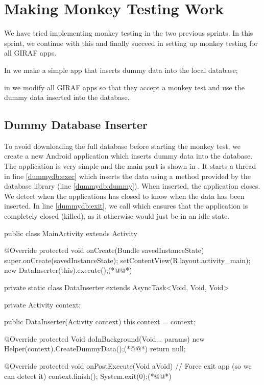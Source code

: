 \chapter{Making Monkey Testing Work}
We have tried implementing monkey testing in the two previous sprints. In this sprint, we continue with this and finally succeed in setting up monkey testing for all GIRAF apps.

\begin{chapterorganization}
  \item In  we make a simple app that inserts dummy data into the local database;
  \item in  we modify all GIRAF apps so that they accept a monkey test and use the dummy data inserted into the database.
\end{chapterorganization}

\section{Dummy Database Inserter}\label{sec:dummy_db_inserter}
To avoid downloading the full database before starting the monkey test, we create a new Android application which inserts dummy data into the database. The application is very simple and the main part is shown in . It starts a thread in line \ref{dummydb:exec} which inserts the data using a method provided by the database library (line \ref{dummydb:dummy}). When inserted, the application closes. We detect when the applications has closed to know when the data has been inserted. In line \ref{dummydb:exit}, we call  which ensures that the application is completely closed (killed), as it otherwise would just be in an idle state.

\begin{javacode}[float=tbp,caption=Dummy database inserter \mono{MainActivity} (written in Java),label=lst:dummy_db_ins_main_activity]
public class MainActivity extends Activity {
    @Override
    protected void onCreate(Bundle savedInstanceState) {
        super.onCreate(savedInstanceState);
        setContentView(R.layout.activity_main);
        new DataInserter(this).execute();(*@\label{dummydb:exec}@*)
    }

    private static class DataInserter extends AsyncTask<Void, Void, Void> {
        private Activity context;

        public DataInserter(Activity context) {
            this.context = context;
        }

        @Override
        protected Void doInBackground(Void... params) {
            new Helper(context).CreateDummyData();(*@\label{dummydb:dummy}@*)
            return null;
        }

        @Override
        protected void onPostExecute(Void aVoid) {
            // Force exit app (so we can detect it)
            context.finish();
            System.exit(0);(*@\label{dummydb:exit}@*)
        }
    }
}
\end{javacode}

